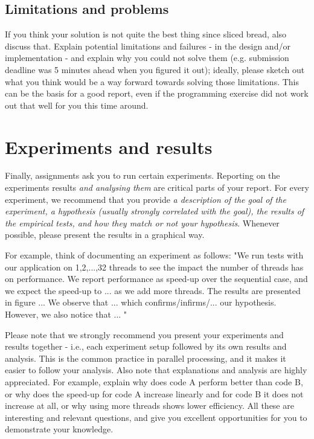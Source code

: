 \documentclass[a4paper,UKenglish,cleveref, autoref, thm-restate]{lipics-v2019}
\begin{document}
	\subsection{Limitations and problems}
		If you think your solution is not quite the best thing since sliced bread, also discuss that. Explain potential limitations and failures - in the design and/or implementation - and explain why you could not solve them (e.g. submission deadline was 5 minutes ahead when you figured it out); ideally, please sketch out what you think would be a way forward towards solving those limitations. This can be the basis for a good report, even if the programming exercise did not work out that well for you this time around.
		
	\section{Experiments and results}
		Finally, assignments ask you to run certain experiments. Reporting on the experiments results \textit{and analysing them} are critical parts of your report. For every experiment, we recommend that you provide \textit{a description of the goal of the experiment, a hypothesis (usually strongly correlated with the goal), the results of the empirical tests, and how they match or not your hypothesis}. Whenever possible, please present the results in a graphical way.
	
	For example, think of documenting an experiment as follows: "We run tests with our application on  1,2,...,32 threads to see the impact the number of threads has on performance. We report performance as speed-up over the  sequential case, and we expect the speed-up to ... as we add more threads. The results are presented in figure ...  We observe that ... which confirms/infirms/... our hypothesis. However, we also notice that ... " 

	Please note that we strongly recommend you present your experiments and results together - i.e., each experiment setup followed by its own results and analysis. This is the common practice in parallel processing, and it makes it easier to follow your analysis. Also note that explanations and analysis are highly appreciated. For example, explain why does code A perform better than code B, or why does the speed-up for code A increase linearly and for code B it does not increase at all, or why using more threads shows lower efficiency. All these are interesting and relevant questions, and give you excellent opportunities for you to demonstrate your knowledge.
\end{document}
